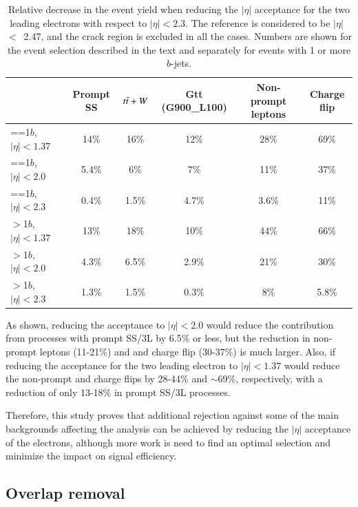 \begin{table}[htb]
\caption{Relative decrease in the event yield when reducing the $|\eta|$ acceptance for the two leading electrons with respect to $|\eta|<2.3$. The reference is considered to be $|\eta|$~$<$~2.47, and the crack region is excluded in all the cases. Numbers are shown for the event selection described in the text and separately for events with 1 or more $b$-jets.}
\label{tab:eleEta}
\begin{center}
    \begin{tabular}{|l|c|c|c|c|c|} \hline
                   & Prompt SS & $t\bar{t} +W$ & Gtt (G900\_L100) & Non-prompt leptons & Charge flip \\ \hline\hline
==1$b$, $|\eta|<1.37$ & 14\% & 16\% & 12\%  & 28\% & 69\% \\
==1$b$, $|\eta|<2.0$  & 5.4\%  & 6\%  & 7\%&  11\% & 37\% \\ 
==1$b$, $|\eta|<2.3$  & 0.4\%  & 1.5\%  & 4.7\%&  3.6\% &  11\% \\ \hline
$>$1$b$, $|\eta|<1.37$ & 13\% & 18\% & 10\%  & 44\% & 66\% \\
$>$1$b$, $|\eta|<2.0$  & 4.3\%  & 6.5\%  & 2.9\%&  21\% &  30\% \\ 
$>$1$b$, $|\eta|<2.3$  & 1.3\%  & 1.5\%  & 0.3\%&  8\% &  5.8\% \\  \hline
\end{tabular}
\end{center}
\end{table}

As shown, reducing the acceptance to  $|\eta|<2.0$ would reduce the contribution from processes with prompt 
SS/3L by 6.5\% or less, but the reduction in non-prompt leptons (11-21\%) and and charge flip (30-37\%) is much larger. Also, if reducing 
the acceptance for the two leading electron to $|\eta|<1.37$ would reduce the non-prompt and 
charge flips by 28-44\% and $\sim$69\%, respectively, with a reduction of only 13-18\% in prompt SS/3L processes. 

Therefore, this study proves that additional rejection against some of the main backgrounds affecting the analysis can be achieved 
by reducing the $|\eta|$ acceptance of the electrons, although more work is need to find an optimal selection and minimize 
the impact on signal efficiency.



\subsection{Overlap removal}

